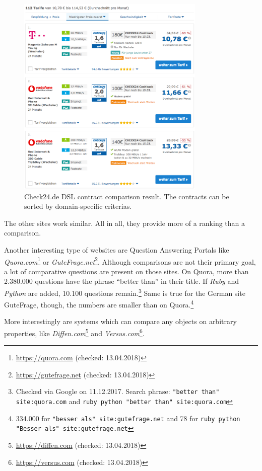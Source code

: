 \begin{figure}[tbp]
 \centering
	\includegraphics[width=0.8\textwidth]{images/ds-sys/check24_2}
	\caption{Check24.de DSL contract comparison result. The contracts can be sorted by domain-specific criterias.}
	\label{img:check24_2}
\end{figure}
The other sites work similar. All in all, they provide more of a ranking than a comparison.


Another interesting type of websites are Question Answering Portals like \emph{Quora.com}\footnote{\url{https://quora.com} (checked: 13.04.2018)} or \emph{GuteFrage.net}\footnote{\url{https://gutefrage.net} (checked: 13.04.2018)}. Although comparisons are not their primary goal, a lot of comparative questions are present on those sites.
On Quora, more than 2.380.000 questions have the phrase \enquote{better than} in their title. If \emph{Ruby} and \emph{Python} are added, 10.100 questions remain.\footnote{Checked via Google on 11.12.2017. Search phrase: \texttt{"better than" site:quora.com} and \texttt{ruby python "better than" site:quora.com}}
Same is true for the German site GuteFrage, though, the numbers are smaller than on Quora.\footnote{334.000 for \texttt{"besser als" site:gutefrage.net} and 78 for \texttt{ruby python "Besser als" site:gutefrage.net}}\newline

More interestingly are systems which can compare any objects on arbitrary properties, like \emph{Diffen.com}\footnote{\url{https://diffen.com} (checked: 13.04.2018)} and \emph{Versus.com}\footnote{\url{https://versus.com} (checked: 13.04.2018)}.

